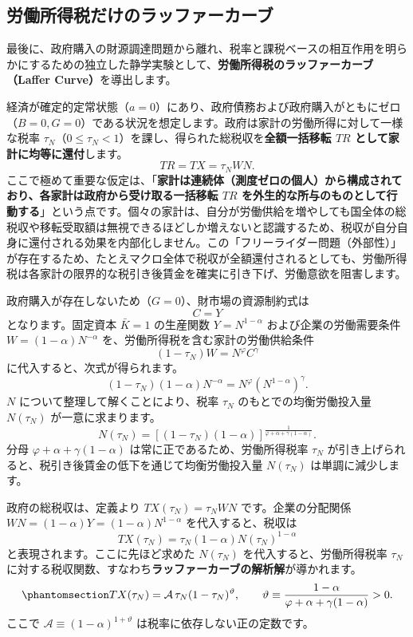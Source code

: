\documentclass[
  japanese,
  lualatex,
  ja=standard,
  12pt,
  a4paper]{ltjsarticle}
\begin{document}
\subsection{労働所得税だけのラッファーカーブ}\label{ux52b4ux50cdux6240ux5f97ux7a0eux3060ux3051ux306eux30e9ux30c3ux30d5ux30a1ux30fcux30abux30fcux30d6}

最後に、政府購入の財源調達問題から離れ、税率と課税ベースの相互作用を明らかにするための独立した静学実験として、\textbf{労働所得税のラッファーカーブ（Laffer
Curve）}を導出します。

経済が確定的定常状態（\(a=0\)）にあり、政府債務および政府購入がともにゼロ（\(B = 0, G = 0\)）である状況を想定します。政府は家計の労働所得に対して一様な税率
\(\tau_N\)（\(0 \leq \tau_N < 1\)）を課し、得られた総税収を\textbf{全額一括移転
\(TR\) として家計に均等に還付}します。 \[
TR = TX = \tau_N W N.
\]
ここで極めて重要な仮定は、「\textbf{家計は連続体（測度ゼロの個人）から構成されており、各家計は政府から受け取る一括移転
\(TR\)
を外生的な所与のものとして行動する}」という点です。個々の家計は、自分が労働供給を増やしても国全体の総税収や移転受取額は無視できるほどしか増えないと認識するため、税収が自分自身に還付される効果を内部化しません。この「フリーライダー問題（外部性）」が存在するため、たとえマクロ全体で税収が全額還付されるとしても、労働所得税は各家計の限界的な税引き後賃金を確実に引き下げ、労働意欲を阻害します。

政府購入が存在しないため（\(G=0\)）、財市場の資源制約式は \[
C = Y
\] となります。固定資本 \(\bar{K}=1\) の生産関数 \(Y = N^{1-\alpha}\)
および企業の労働需要条件 \(W = (1-\alpha)N^{-\alpha}\)
を、労働所得税を含む家計の労働供給条件 \[
(1-\tau_N) W = N^\varphi C^\gamma
\] に代入すると、次式が得られます。 \[
(1-\tau_N) (1-\alpha) N^{-\alpha} = N^\varphi \left( N^{1-\alpha} \right)^\gamma.
\] \(N\) について整理して解くことにより、税率 \(\tau_N\)
のもとでの均衡労働投入量 \(N(\tau_N)\) が一意に求まります。 \[
N(\tau_N) = \left[ (1-\tau_N)(1-\alpha) \right]^{\frac{1}{\varphi + \alpha + \gamma(1-\alpha)}}.
\] 分母 \(\varphi + \alpha + \gamma(1-\alpha)\)
は常に正であるため、労働所得税率 \(\tau_N\)
が引き上げられると、税引き後賃金の低下を通じて均衡労働投入量
\(N(\tau_N)\) は単調に減少します。

政府の総税収は、定義より \(TX(\tau_N) = \tau_N W N\)
です。企業の分配関係 \(W N = (1-\alpha) Y = (1-\alpha) N^{1-\alpha}\)
を代入すると、税収は \[
TX(\tau_N) = \tau_N (1-\alpha) N(\tau_N)^{1-\alpha}
\] と表現されます。ここに先ほど求めた \(N(\tau_N)\)
を代入すると、労働所得税率 \(\tau_N\)
に対する税収関数、すなわち\textbf{ラッファーカーブの解析解}が導かれます。
\begin{equation}\protect\phantomsection\label{eq-laffer-revenue}{
TX(\tau_N) = \mathcal{A}\, \tau_N (1-\tau_N)^\vartheta, \qquad \vartheta \equiv \frac{1-\alpha}{\varphi+\alpha+\gamma(1-\alpha)} > 0.
}\end{equation} ここで \(\mathcal{A} \equiv (1-\alpha)^{1+\vartheta}\)
は税率に依存しない正の定数です。
\end{document}
